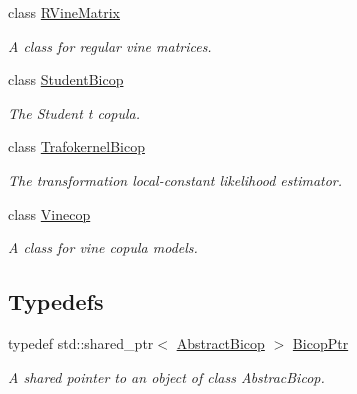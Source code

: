 \begin{DoxyCompactItemize}
class \hyperlink{classvinecopulib_1_1_r_vine_matrix}{R\+Vine\+Matrix}
\begin{DoxyCompactList}\small\item\em A class for regular vine matrices. \end{DoxyCompactList}\item 
class \hyperlink{classvinecopulib_1_1_student_bicop}{Student\+Bicop}
\begin{DoxyCompactList}\small\item\em The Student t copula. \end{DoxyCompactList}\item 
class \hyperlink{classvinecopulib_1_1_trafokernel_bicop}{Trafokernel\+Bicop}
\begin{DoxyCompactList}\small\item\em The transformation local-\/constant likelihood estimator. \end{DoxyCompactList}\item 
class \hyperlink{classvinecopulib_1_1_vinecop}{Vinecop}
\begin{DoxyCompactList}\small\item\em A class for vine copula models. \end{DoxyCompactList}\end{DoxyCompactItemize}
\subsection*{Typedefs}
\begin{DoxyCompactItemize}
\item 
typedef std\+::shared\+\_\+ptr$<$ \hyperlink{classvinecopulib_1_1_abstract_bicop}{Abstract\+Bicop} $>$ \hyperlink{namespacevinecopulib_afd73d02952b845883499cbbda1996204}{Bicop\+Ptr}\hypertarget{namespacevinecopulib_afd73d02952b845883499cbbda1996204}{}\label{namespacevinecopulib_afd73d02952b845883499cbbda1996204}

\begin{DoxyCompactList}\small\item\em A shared pointer to an object of class Abstrac\+Bicop. \end{DoxyCompactList}\end{DoxyCompactItemize}
